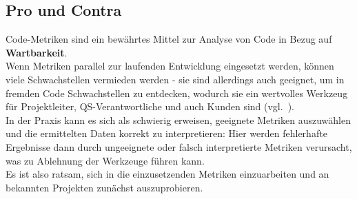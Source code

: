 \subsection*{Pro und Contra}
Code-Metriken sind ein bewährtes Mittel zur Analyse von Code in Bezug auf \textbf{Wartbarkeit}.\\
Wenn Metriken parallel zur laufenden Entwicklung eingesetzt werden, können viele Schwachstellen vermieden werden - sie sind allerdings auch geeignet, um in fremden Code Schwachstellen zu entdecken, wodurch sie ein wertvolles Werkzeug für Projektleiter, QS-Verantwortliche und auch Kunden sind (vgl.~\cite[39]{Wed09c}).\\
In der Praxis kann es sich als schwierig erweisen, geeignete Metriken auszuwählen und die ermittelten Daten korrekt zu interpretieren: Hier werden fehlerhafte Ergebnisse dann durch ungeeignete oder falsch interpretierte Metriken verursacht, was zu Ablehnung der Werkzeuge führen kann.\\
Es ist also ratsam, sich in die einzusetzenden Metriken einzuarbeiten und an bekannten Projekten zunächst auszuprobieren.
